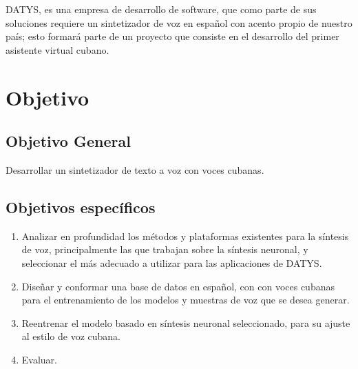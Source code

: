DATYS, es una empresa de desarrollo de software, que como parte de sus soluciones requiere un sintetizador de voz en español con acento propio de nuestro país; esto formará parte de un proyecto que consiste en el desarrollo del primer asistente virtual cubano. 

\section*{Objetivo}

\subsection*{Objetivo General}

Desarrollar un sintetizador de texto a voz con voces cubanas.

\subsection*{Objetivos específicos}
\begin{enumerate}
	\item Analizar en profundidad los métodos y plataformas existentes para la síntesis de voz, principalmente las que trabajan sobre la síntesis neuronal, y seleccionar el más adecuado a utilizar para las aplicaciones de DATYS.
	\item Diseñar y conformar una base de datos en español, con con voces cubanas para el entrenamiento de los modelos y muestras de voz que se desea generar.
	\item Reentrenar el modelo basado en síntesis neuronal seleccionado, para su ajuste al estilo de voz cubana.
	\item Evaluar.
\end{enumerate}